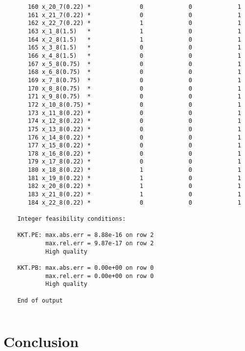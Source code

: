 \documentclass{article}[A4]
\begin{document}
\begin{verbatim}
	   160 x_20_7(0.22) *              0             0             1 
	   161 x_21_7(0.22) *              0             0             1 
	   162 x_22_7(0.22) *              1             0             1 
	   163 x_1_8(1.5)   *              1             0             1 
	   164 x_2_8(1.5)   *              1             0             1 
	   165 x_3_8(1.5)   *              0             0             1 
	   166 x_4_8(1.5)   *              0             0             1 
	   167 x_5_8(0.75)  *              0             0             1 
	   168 x_6_8(0.75)  *              0             0             1 
	   169 x_7_8(0.75)  *              0             0             1 
	   170 x_8_8(0.75)  *              0             0             1 
	   171 x_9_8(0.75)  *              0             0             1 
	   172 x_10_8(0.75) *              0             0             1 
	   173 x_11_8(0.22) *              0             0             1 
	   174 x_12_8(0.22) *              0             0             1 
	   175 x_13_8(0.22) *              0             0             1 
	   176 x_14_8(0.22) *              0             0             1 
	   177 x_15_8(0.22) *              0             0             1 
	   178 x_16_8(0.22) *              0             0             1 
	   179 x_17_8(0.22) *              0             0             1 
	   180 x_18_8(0.22) *              1             0             1 
	   181 x_19_8(0.22) *              1             0             1 
	   182 x_20_8(0.22) *              1             0             1 
	   183 x_21_8(0.22) *              1             0             1 
	   184 x_22_8(0.22) *              0             0             1 
	
	Integer feasibility conditions:
	
	KKT.PE: max.abs.err = 8.88e-16 on row 2
			max.rel.err = 9.87e-17 on row 2
			High quality
	
	KKT.PB: max.abs.err = 0.00e+00 on row 0
			max.rel.err = 0.00e+00 on row 0
			High quality
	
	End of output
	
\end{verbatim}
\section{Conclusion}
\end{document}
